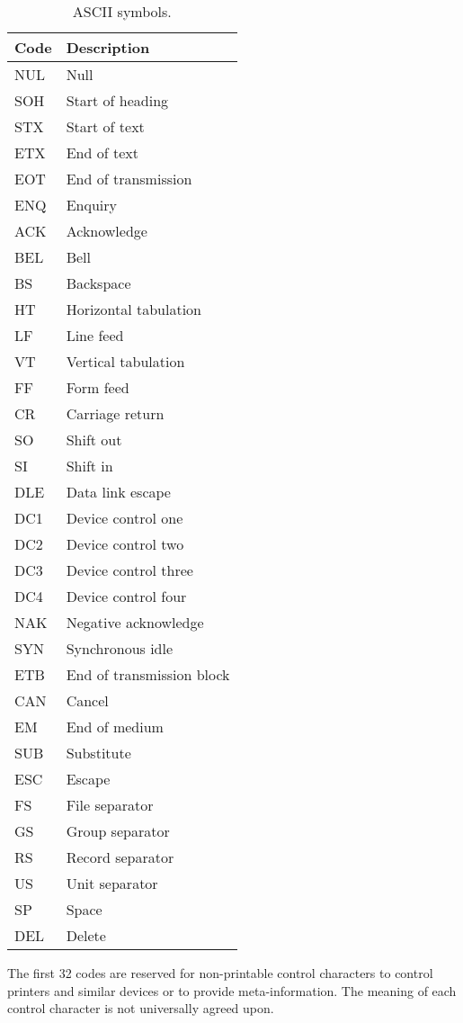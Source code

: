 \begin{table}
  \centering
  \begin{tabular}{|l|l|}
    \hline
    \rowcolor{headerRowColor} Code & Description\\
    \hline
    NUL & Null\\
    SOH & Start of heading\\
    STX & Start of text\\
    ETX & End of text\\
    EOT & End of transmission\\
    ENQ & Enquiry\\
    ACK & Acknowledge\\
    BEL & Bell\\
    BS & Backspace\\
    HT & Horizontal tabulation\\
    LF & Line feed\\
    VT & Vertical tabulation\\
    FF & Form feed\\
    CR & Carriage return\\
    SO & Shift out\\
    SI & Shift in\\
    DLE & Data link escape\\
    DC1 & Device control one\\
    DC2 & Device control two\\
    DC3 & Device control three\\
    DC4 & Device control four\\
    NAK & Negative acknowledge\\
    SYN & Synchronous idle\\
    ETB & End of transmission block\\
    CAN & Cancel\\
    EM & End of medium\\
    SUB & Substitute\\
    ESC & Escape\\
    FS & File separator\\
    GS & Group separator\\
    RS & Record separator\\
    US & Unit separator\\
    SP & Space\\
    DEL & Delete\\
    \hline
  \end{tabular}
  \caption{ASCII symbols.}
  \label{tab:asciiSpecialSymbols}
\end{table}
The first 32 codes are reserved for non-printable control characters to control printers and similar devices or to provide meta-information. The meaning of each control character is not universally agreed upon.

